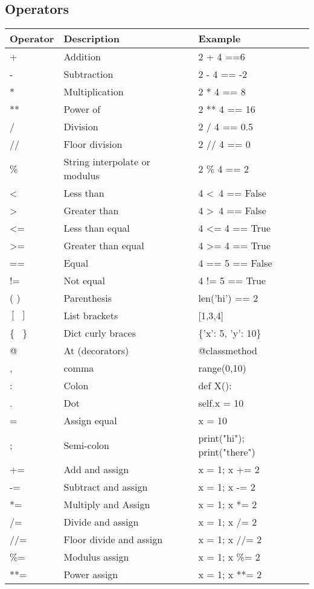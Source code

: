 \documentclass[12pt]{article}
\begin{document}
\subsection{Operators}
\begin{tabular}{|l|l|l|}
	\hline
	\textbf{Operator} & \textbf{Description} & \textbf{Example}\\ \hline
	+ & Addition & 2 + 4 ==6\\
	- & Subtraction & 2 - 4 == -2\\
	* & Multiplication & 2 * 4 == 8\\
	** & Power of & 2 ** 4 == 16\\
	/ & Division & 2 / 4  == 0.5\\
	// & Floor division & 2 // 4 == 0\\
	\% & String interpolate or modulus & 2 \% 4 == 2\\
	\textless & Less than & 4 \textless ~4 == False\\
	\textgreater & Greater than & 4 \textgreater ~4 == False\\
	\textless = & Less than equal & 4 \textless = 4 == True\\
	\textgreater = & Greater than equal & 4 \textgreater = 4 == True\\
	== & Equal & 4 == 5 == False\\
	!= & Not equal & 4 != 5 == True\\
	( ) & Parenthesis & len('hi') == 2\\
	$[~~]$ & List brackets & [1,3,4]\\
	\{ ~\} & Dict curly braces & \{'x': 5, 'y': 10\}\\
	@ & At (decorators) & @classmethod\\
	, & comma & range(0,10)\\
	: & Colon & def X():\\
	. & Dot & self.x = 10\\
	= & Assign equal & x = 10\\
	; & Semi-colon & print("hi"); print("there")\\
	+= & Add and assign & x = 1; x += 2\\
	-= & Subtract and assign & x = 1; x -= 2\\
	*= & Multiply and Assign & x = 1; x *= 2\\
	/= & Divide and assign & x = 1; x /= 2\\
	//= & Floor divide and assign & x = 1; x //= 2\\
	\%= & Modulus assign & x = 1; x \%= 2\\
	**= & Power assign & x = 1; x **= 2\\
	
	
	\hline
\end{tabular}
\end{document}

